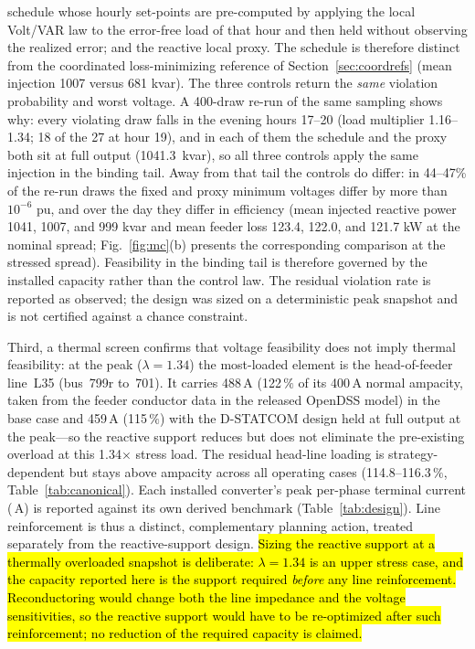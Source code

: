 \documentclass{ieeeaccess}
\makeatletter
\newcommand{\rev}[1]{{\color{red}\hl{#1}}}
\newcommand{\rev}[1]{#1}
\providecommand{\percent}{\%}
\newcommand{\num}[1]{#1}
\newcommand{\SI}[2]{#1\,\ensuremath{\mathrm{#2}}}
\newcommand{\SIrange}[3]{#1\mbox{--}#2\,\ensuremath{\mathrm{#3}}}
\def\kie@silistiii#1;#2;#3\@nil{#1, #2, and #3}
\newcommand{\SIlist}[2]{\kie@silistiii#1\@nil\,\ensuremath{\mathrm{#2}}}
\makeatother
\begin{document}
{schedule whose hourly set-points are pre-computed by applying the local Volt/VAR law to the
error-free load of that hour and then held without observing the realized error; and the
reactive local proxy. The schedule is therefore distinct from the coordinated
loss-minimizing reference of Section~\mbox{\ref{sec:coordrefs}} (mean injection
\mbox{1007} versus \mbox{681} kvar). The three controls return the \emph{same} violation
probability and worst voltage. A 400-draw re-run of the same sampling shows why: every
violating draw falls in the evening hours 17--20 (load multiplier \mbox{1.16--1.34}; 18 of
the 27 at hour 19), and in each of them the schedule and the proxy both sit at full output
(\mbox{1041.3 kvar}), so all three controls apply the same injection in the binding tail.
Away from that tail the controls do differ: in \mbox{44--47\%} of the re-run draws the fixed
and proxy minimum voltages differ by more than \mbox{$10^{-6}$} pu, and over the day they
differ in efficiency (mean injected reactive power \mbox{1041}, \mbox{1007}, and \mbox{999}
kvar and mean feeder loss \mbox{123.4}, \mbox{122.0}, and \mbox{121.7} kW at the nominal
spread; Fig.~\mbox{\ref{fig:mc}}(b) presents the corresponding comparison at the stressed
spread). Feasibility in the binding tail is therefore governed by
the installed capacity rather than the control law. The residual violation rate is reported
as observed; the design was sized on a deterministic peak snapshot and is not certified
against a chance constraint.}

Third, a thermal screen confirms that voltage
feasibility does not imply thermal feasibility: at the peak ($\lambda=1.34$) the
most-loaded element is the head-of-feeder line~L35 (bus~799r to~701). It carries
\SI{488}{A} (\SI{122}{\percent} of its \SI{400}{A} normal ampacity, taken from the
feeder conductor data in the released OpenDSS model) in the base
case and \SI{459}{A} (\SI{115}{\percent}) with the D-STATCOM design held at full
output at the peak---so the reactive support reduces but does not eliminate the
pre-existing overload at this \num{1.34}$\times$ stress load. The residual head-line
loading is strategy-dependent but stays above ampacity across all operating cases
(\SIrange{114.8}{116.3}{\percent}, Table~\ref{tab:canonical}). Each installed
converter's peak per-phase terminal current (\SIlist{48.2;30.6;48.8}{A}) is
reported against its own derived benchmark (Table~\ref{tab:design}). Line
reinforcement is thus a distinct, complementary planning action, treated separately
from the reactive-support design. \rev{Sizing the reactive support at a thermally
overloaded snapshot is deliberate: \mbox{$\lambda=1.34$} is an upper stress case, and the
capacity reported here is the support required \emph{before} any line reinforcement.
Reconductoring would change both the line impedance and the voltage sensitivities, so
the reactive support would have to be re-optimized after such reinforcement; no
reduction of the required capacity is claimed.}
\end{document}
